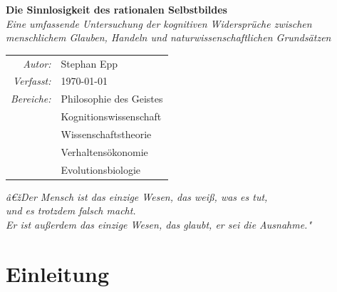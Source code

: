 ﻿\documentclass[12pt, a4paper]{article}
\begin{document}
\begin{titlepage}
  \centering
  \vspace*{2cm}

  {\LARGE\bfseries Die Sinnlosigkeit des rationalen Selbstbildes}\\[1em]
  {\large\itshape Eine umfassende Untersuchung der kognitiven Widersprüche zwischen\\[0.3em]
  menschlichem Glauben, Handeln und naturwissenschaftlichen Grundsätzen}

  \vspace{2cm}

  \begin{tabular}{rl}
    \textit{Autor:}         & Stephan Epp \\[0.5em]
    \textit{Verfasst:}      & \today \\[0.5em]
    \textit{Bereiche:}      & Philosophie des Geistes\\
                             & Kognitionswissenschaft\\
                             & Wissenschaftstheorie\\
                             & Verhaltensökonomie\\
                             & Evolutionsbiologie \\
  \end{tabular}

  \vfill

  \begin{infobox}
    \centering\small\itshape
    â€žDer Mensch ist das einzige Wesen, das weiß, was es tut,\\
    und es trotzdem falsch macht.\\[0.3em]
    Er ist außerdem das einzige Wesen, das glaubt, er sei die Ausnahme."
  \end{infobox}
\end{titlepage}

\newpage
\tableofcontents
\newpage

\section{Einleitung}
\end{document}

